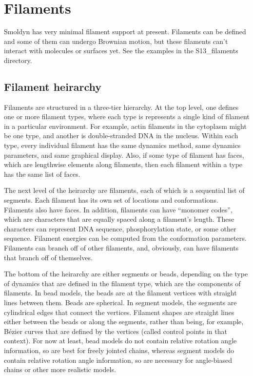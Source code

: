 \documentclass {scrbook}
\begin{document}
\chapter{Filaments}

Smoldyn has very minimal filament support at present. Filaments can be defined and some of them can undergo Brownian motion, but these filaments can't interact with molecules or surfaces yet. See the examples in the S13\_filaments directory.

\section{Filament heirarchy}

Filaments are structured in a three-tier hierarchy. At the top level, one defines one or more filament types, where each type is represents a single kind of filament in a particular environment. For example, actin filaments in the cytoplasm might be one type, and another is double-stranded DNA in the nucleus. Within each type, every individual filament has the same dynamics method, same dynamics parameters, and same graphical display. Also, if some type of filament has faces, which are lengthwise elements along filaments, then each filament within a type has the same list of faces.

The next level of the heirarchy are filaments, each of which is a sequential list of segments. Each filament has its own set of locations and conformations. Filaments also have faces. In addition, filaments can have ``monomer codes'', which are characters that are equally spaced along a filament's length. These characters can represent DNA sequence, phosphorylation state, or some other sequence.  Filament energies can be computed from the conformation parameters. Filaments can branch off of other filaments, and, obviously, can have filaments that branch off of themselves.

The bottom of the heirarchy are either segments or beads, depending on the type of dynamics that are defined in the filament type, which are the components of filaments. In bead models, the beads are at the filament vertices with straight lines between them. Beads are spherical. In segment models, the segments are cylindrical edges that connect the vertices. Filament shapes are straight lines either between the beads or along the segments, rather than being, for example, B\'{e}zier curves that are defined by the vertices (called control points in that context). For now at least, bead models do not contain relative rotation angle information, so are best for freely jointed chains, whereas segment models do contain relative rotation angle information, so are necessary for angle-biased chains or other more realistic models.
\end{document}
